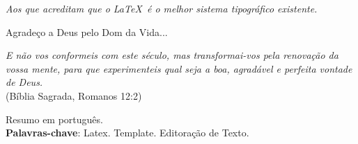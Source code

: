 \documentclass[
	12pt,    %
	oneside, %
	a4paper, %
	chapter=TITLE, %
	section=TITLE, %
	sumario=tradicional, %
	english, %
	brazil   %
] {abntex2}
\begin{document}
	\pretextual
	\imprimircapa
	
	\imprimirfolhaderosto
	
	\imprimirfolhadeaprovacao

	\begin{dedicatoria}
		\vspace*{\fill}
		\hfill		
		\begin{minipage}[b][5cm]{.5\textwidth}
			\textit{Aos que acreditam que o \LaTeX\ é o melhor sistema tipográfico existente.}
		\end{minipage}		
	\end{dedicatoria}

	\begin{agradecimentos}				
		Agradeço a Deus pelo Dom da Vida...
	\end{agradecimentos}	

	\begin{epigrafe}	
		\vspace*{\fill}
		\hfill		
		\begin{minipage}[b][5cm]{.7\textwidth}
			\textit{E não vos conformeis com este século, mas transformai-vos pela renovação da vossa mente, para que experimenteis qual seja a boa, agradável e perfeita vontade de Deus.}\\
			(Bíblia Sagrada, Romanos 12:2)
		\end{minipage}
	\end{epigrafe}
	
	\begin{resumo}
		Resumo em português.
		\vspace{\onelineskip}
		\noindent \\
		\textbf{Palavras-chave}: Latex. Template. Editoração de Texto.
	\end{resumo}
	
\end{document}
